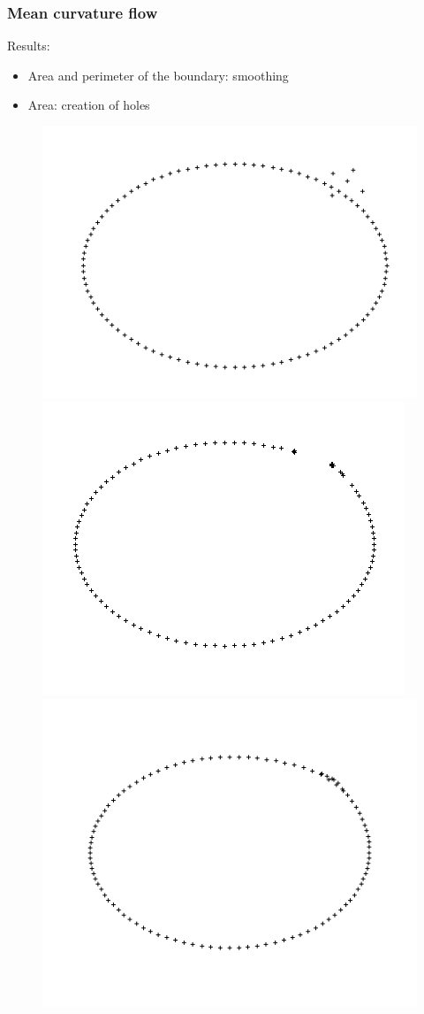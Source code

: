 \documentclass{beamer}
\begin{document}
\begin{frame}
    \frametitle{Mean curvature flow}

    Results:
    \begin{itemize}
        \item Area and perimeter of the boundary: smoothing
        \item Area: creation of holes
    \end{itemize}

    \begin{figure}
        \centering
        \includegraphics[scale=0.22]{img/ellipse-outliers}
        \includegraphics[scale=0.22]{img/ellipse-outliers-area}
        \includegraphics[scale=0.22]{img/ellipse-outliers-perimeter}

\end{figure}
\end{frame}
\end{document}
